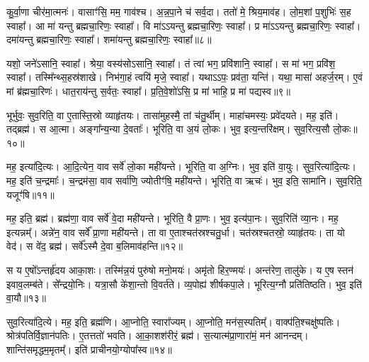 कु॒र्वा॒णा चीर॑मा॒त्मनः॑। 
वासाꣳ॑सि॒ मम॒ गाव॑श्च। 
अ॒न्न॒पा॒ने च॑ सर्व॒दा। 
ततो॑ मे॒ श्रिय॒माव॑ह। 
लो॒म॒शां प॒शुभिः॑ स॒ह स्वाहा᳚। 
आ मा॑ यन्तु ब्रह्मचा॒रिणः॒ स्वाहा᳚। 
वि मा॑ऽऽयन्तु ब्रह्मचा॒रिणः॒ स्वाहा᳚। 
प्र मा॑ऽऽयन्तु ब्रह्मचा॒रिणः॒ स्वाहा᳚। 
दमा॑यन्तु ब्रह्मचा॒रिणः॒ स्वाहा᳚। 
शमा॑यन्तु ब्रह्मचा॒रिणः॒ स्वाहा᳚॥८॥

यशो॒ जने॑ऽसानि॒ स्वाहा᳚। 
श्रेया॒\an{} वस्य॑सोऽसानि॒ स्वाहा᳚। 
तं त्वा॑ भग॒ प्रवि॑शानि॒ स्वाहा᳚। 
स मा॑ भग॒ प्रवि॑श॒ स्वाहा᳚। 
तस्मि᳚न्थ्स॒हस्र॑शाखे। 
निभ॑गा॒हं त्वयि॑ मृजे॒ स्वाहा᳚। 
यथाऽऽपः॒ प्रव॑ता॒ यन्ति॑। 
यथा॒ मासा॑ अहर्ज॒रम्। 
ए॒वं मां ब्र॑ह्मचा॒रिणः॑। 
धात॒राय॑न्तु स॒र्वतः॒ स्वाहा᳚। 
प्र॒ति॒वे॒शो॑ऽसि॒ प्र मा॑ भाहि॒ प्र मा॑ पद्यस्व॥९॥
\anuvakamend%

भूर्भुवः॒ सुव॒रिति॒ वा ए॒तास्ति॒स्रो व्याहृ॑तयः। 
तासा॑मुहस्मै॒ तां च॑तु॒र्थीम्। 
माहा॑चमस्यः॒ प्रवे॑दयते। 
मह॒ इति॑। 
तद्ब्रह्म॑। 
स आ॒त्मा। 
अङ्गा᳚न्य॒न्या दे॒वताः᳚। 
भूरिति॒ वा अ॒यं लो॒कः। 
भुव॒ इत्य॒न्तरि॑क्षम्। 
सुव॒रित्य॒सौ लो॒कः॥१०॥

मह॒ इत्या॑दि॒त्यः। 
आ॒दि॒त्येन॒ वाव सर्वे॑ लो॒का मही॑यन्ते। 
भूरिति॒ वा अ॒ग्निः। 
भुव॒ इति॑ वा॒युः। 
सुव॒रित्या॑दि॒त्यः। 
मह॒ इति॑ च॒न्द्रमाः᳚। 
च॒न्द्रम॑सा॒ वाव सर्वा॑णि॒ ज्योतीꣳ॑षि॒ मही॑यन्ते। 
भूरिति॒ वा ऋचः॑। 
भुव॒ इति॒ सामा॑नि। 
सुव॒रिति॒ यजूꣳ॑षि॥११॥

मह॒ इति॒ ब्रह्म॑। 
ब्रह्म॑णा॒ वाव सर्वे॑ वे॒दा मही॑यन्ते। 
भूरिति॒ वै प्रा॒णः। 
भुव॒ इत्य॑पा॒नः। 
सुव॒रिति॑ व्या॒नः। 
मह॒ इत्यन्नम्᳚। 
अन्ने॑न॒ वाव सर्वे᳚ प्रा॒णा मही॑यन्ते। 
ता वा ए॒ताश्चत॑स्रश्चतु॒र्धा। 
चत॑स्रश्चतस्रो॒ व्याहृ॑तयः। 
ता यो वेद॑। 
स वे॑द॒ ब्रह्म॑। 
सर्वे᳚ऽस्मै दे॒वा ब॒लिमाव॑हन्ति॥१२॥
\anuvakamend[अ॒सौ लो॒को यजूꣳ॑षि॒ वेद॒ द्वे च॑]

स य ए॒षो᳚ऽन्तर्\mbox{}हृ॑दय आका॒शः। 
तस्मि॑न्न॒यं पुरु॑षो मनो॒मयः॑। 
अमृ॑तो हिर॒ण्मयः॑। 
अन्त॑रेण॒ तालु॑के। 
य ए॒ष स्तन॑ इवाव॒\-लम्ब॑ते। 
से᳚न्द्रयो॒निः। 
यत्रा॒सौ के॑शा॒न्तो वि॒वर्त॑ते। 
व्य॒पोह्य॑ शीर्\mbox{}षकपा॒ले। 
भूरित्य॒ग्नौ प्रति॑तिष्ठति। 
भुव॒ इति॑ वा॒यौ॥१३॥

सुव॒रित्या॑दि॒त्ये। 
मह॒ इति॒ ब्रह्म॑णि। 
आ॒प्नोति॒ स्वारा᳚ज्यम्। 
आ॒प्नोति॒ मन॑स॒स्पतिम्᳚। 
वाक्प॑ति॒श्चक्षु॑ष्पतिः। 
श्रोत्र॑पतिर्वि॒\-ज्ञान॑पतिः। 
ए॒तत्ततो॑ भवति। 
आ॒का॒शश॑रीरं॒ ब्रह्म॑। 
स॒त्यात्म॑प्रा॒णारा॑मं॒ मन॑ आनन्दम्। 
शान्ति॑समृद्धम॒मृतम्᳚। 
इति॑ प्राचीनयो॒ग्योपा᳚स्व॥१४॥
\anuvakamend[वा॒याव॒मृत॒मेकं॑ च]

